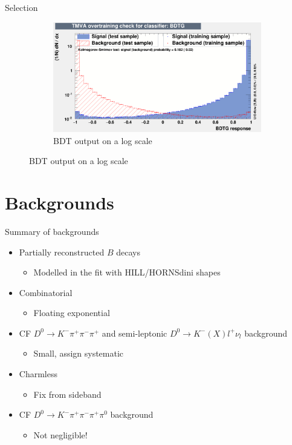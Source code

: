 \documentclass{beamer}
\begin{document}
\begin{frame}{Selection}
\begin{figure}
    \begin{subfigure}{0.4\textwidth}
      \includegraphics[width = 1.0\textwidth]{Plots/overtrain_BDTG_log.png}
      \caption{BDT output on a log scale}
    \end{subfigure}
  \end{figure}
\end{frame}

\section{Backgrounds}

\begin{frame}{Summary of backgrounds}
  \begin{itemize}
    \setlength\itemsep{1.0em}
    \item{Partially reconstructed $B$ decays}
    \begin{itemize}
      \item{Modelled in the fit with HILL/HORNSdini shapes}
    \end{itemize}
    \item{Combinatorial}
    \begin{itemize}
      \item{Floating exponential}
    \end{itemize}
    \item{CF $D^0\to K^-\pi^+\pi^-\pi^+$ and semi-leptonic $D^0\to K^-(X)l^+\nu_l$ background}
    \begin{itemize}
      \item{Small, assign systematic}
    \end{itemize}
    \item{Charmless}
    \begin{itemize}
      \item{Fix from sideband}
    \end{itemize}
    \item{CF $D^0\to K^-\pi^+\pi^-\pi^+\pi^0$ background}
    \begin{itemize}
      \item{Not negligible!}
    \end{itemize}
  \end{itemize}
\end{frame}
\end{document}
